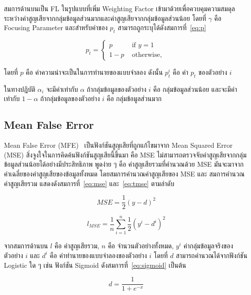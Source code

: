 สมการด้านบนเป็น FL ในรูปแบบที่เพิ่ม Weighting Factor เข้ามาด้วยเพื่อควบคุมความสมดุลระหว่างค่าสูญเสียจากกลุ่มข้อมูลส่วนมากและค่าสูญเสียจากกลุ่มข้อมูลส่วนน้อย โดยที่ $\gamma$ คือ Focusing Parameter และสำหรับค่าของ $p_{t}$ สามารถถูกระบุได้ดังสมการที่~\ref{eq:p}

\begin{equation} \label{eq:p}
	p_{t} = 
	\begin{cases}
		p & \text{ if } y = 1\\ 
		1 - p & \text{ otherwise, } 
	\end{cases}
\end{equation} 

โดยที่ $p$ คือ ค่าความน่าจะเป็นในการทำนายของแบบจำลอง ดังนั้น $p_{t}^{i}$ คือ ค่า $p_{t}$ ของตัวอย่าง $i$

ในทางปฎิบัติ $\alpha_{i}$ จะมีค่าเท่ากับ $\alpha$ ถ้ากลุ่มข้อมูลของตัวอย่าง $i$ คือ กลุ่มข้อมูลส่วนน้อย และจะมีค่าเท่ากับ $1-\alpha$ ถ้ากลุ่มข้อมูลของตัวอย่าง $i$ คือ กลุ่มข้อมูลส่วนมาก

\subsection{Mean False Error}
Mean False Error (MFE)~\cite{Wang:2016} เป็นฟังก์ชันสูญเสียที่ถูกแก้ไขมาจาก Mean Squared Error (MSE) สิ่งจูงใจในการคิดค้นฟังก์ชันสูญเสียนี้ขึ้นมา คือ MSE ไม่สามารถตรวจจับค่าสูญเสียจากกลุ่มข้อมูลส่วนน้อยได้อย่างมีประสิทธิภาพ พูดง่าย ๆ คือ ค่าสูญเสียรวมที่คำนวณด้วย MSE มันจะมาจากค่าเฉลี่ยของค่าสูญเสียของข้อมูลทั้งหมด โดยสมการคำนวณค่าสูญเสียของ MSE และ สมการคำนวณค่าสูญเสียรวม แสดงดังสมการที่~\ref{eq:mse} และ~\ref{eq:tmse} ตามลำดับ

\begin{equation} \label{eq:mse}
    MSE = \frac{1}{2}(y - d)^{2}
\end{equation}

\begin{equation} \label{eq:tmse}
    l_{MSE} = \frac{1}{n}\sum_{i=1}^{n}\frac{1}{2}(y^{i} - d^{i})^{2}
\end{equation}

จากสมการด้านบน $l$ คือ ค่าสูญเสียรวม, $n$ คือ จำนวนตัวอย่างทั้งหมด, $y^{i}$ ค่ากลุ่มข้อมูลจริงของตัวอย่าง $i$ และ $d^{i}$ คือ ค่าทำนายของแบบจำลองของตัวอย่าง $i$ โดยที่ $d$ สามารถคำนวณได้จากฟังก์ชัน Logistic ใด ๆ เช่น ฟังก์ชัน Sigmoid ดังสมการที่~\ref{eq:sigmoid} เป็นต้น

\begin{equation} \label{eq:sigmoid}
d =  \frac{\mathrm{1} }{\mathrm{1} + e^{-x} }
\end{equation}

